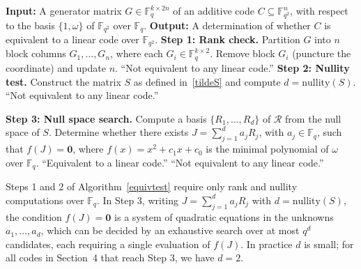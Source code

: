 \documentclass[a4paper,12pt]{article}
\theoremstyle{plain}
\theoremstyle{definition}
\begin{document}
 
\begin{algorithm}[H]
\caption{Equivalence Test for Additive Codes}
\label{equivtest}
\begin{algorithmic}[1]
\Statex \textbf{Input:} A generator matrix $G \in \mathbb{F}_q^{k \times 2n}$ of an additive code $C \subseteq \mathbb{F}_{q^2}^n$,  with respect to the basis $\{1, \omega\}$ of $\mathbb{F}_{q^2}$ over $\mathbb{F}_q$.  
\Statex \textbf{Output:} A determination of whether $C$ is equivalent to a linear code over $\mathbb{F}_{q^2}$.
\Statex
\Statex \textbf{Step 1: Rank check.}
\State Partition $G$ into $n$ block columns $G_1, \dots, G_n$, where each $G_i \in \mathbb{F}_q^{k \times 2}$.
        \State Remove block $G_i$ (puncture the coordinate) and update $n$.
    \EndIf
\EndFor
{}
        \State \Return ``Not equivalent to any linear code.'' 
    \EndIf
\EndFor
\Statex
\Statex \textbf{Step 2: Nullity test.}
\State Construct the matrix $S$ as defined in~\eqref{tildeS} and compute $d = \mathrm{nullity}(S)$.
    \State \Return ``Not equivalent to any linear code.'' 
\EndIf

\Statex \textbf{Step 3: Null space search.}
\State Compute a basis $\{R_1, \dots, R_d\}$ of $\mathcal{R}$ from the null space of $S$.
\State Determine whether there exists $J = \sum_{j=1}^{d} a_j R_j$, with $a_j \in \mathbb{F}_q$, such that $f(J) = \mathbf{0}$, where $f(x) = x^2 + c_1 x + c_0$ is the minimal polynomial of $\omega$ over $\mathbb{F}_q$.
    \State \Return ``Equivalent to a linear code.'' 
\Else
    \State \Return ``Not equivalent to any linear code.'' 
\EndIf
\color{black}
\end{algorithmic}
\end{algorithm}

Steps 1 and 2 of Algorithm~\ref{equivtest} require only rank and nullity computations over $\mathbb{F}_q$. 
In Step 3, writing $J = \sum_{j=1}^{d} a_j R_j$ with $d = \mathrm{nullity}(S)$, 
the condition $f(J) = \mathbf{0}$ is a system of quadratic equations in the unknowns 
$a_1, \dots, a_d$, which can be decided by an exhaustive search over at most 
$q^d$ candidates, each requiring a single evaluation of $f(J)$. 
In practice $d$ is small; for all codes in Section~4 that reach Step 3, we have $d = 2$.
\end{document}
